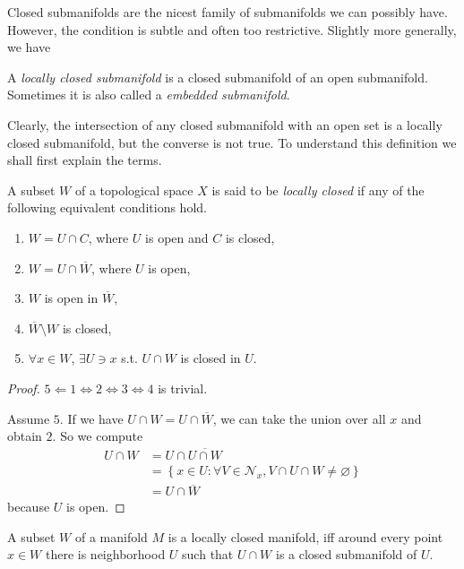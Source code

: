 Closed submanifolds are the nicest family of submanifolds we can possibly have. However, the condition is subtle and often too restrictive. Slightly more generally, we have

\begin{definition}
    A \emph{locally closed submanifold} is a closed submanifold of an open submanifold. Sometimes it is also called a \emph{embedded submanifold}.
\end{definition}

Clearly, the intersection of any closed submanifold with an open set is a locally closed submanifold, but the converse is not true. To understand this definition we shall first explain the terms.

\begin{proposition}\label{prop.locclose}
    A subset $W$ of a topological space $X$ is said to be \emph{locally closed} if any of the following equivalent conditions hold.
    \begin{enumerate}
        \item $W=U\cap C$, where $U$ is open and $C$ is closed,
        \item $W=U\cap\overline{W}$, where $U$ is open,
        \item $W$ is open in $\overline{W}$,
        \item $\overline{W}\setminus W$ is closed,
        \item $\forall x\in W$, $\exists U\ni x$ s.t. $U\cap W$ is closed in $U$.
    \end{enumerate}
\end{proposition}

\begin{proof}
    $5\Longleftarrow 1\Longleftrightarrow 2\Longleftrightarrow 3\Longleftrightarrow 4$ is trivial. 

    Assume $5$. If we have $U\cap W=U\cap\overline{W}$, we can take the union over all $x$ and obtain $2$. So we compute
    \begin{align*}
        U\cap W &= U\cap\overline{U\cap W} \\
        &= \left\{x\in U:\forall V\in\mathcal{N}_x, V\cap U\cap W\neq\varnothing\right\} \\
        &= U\cap\overline{W}
    \end{align*}
    because $U$ is open.
\end{proof}

\begin{proposition}
    A subset $W$ of a manifold $M$ is a locally closed manifold, iff around every point $x\in W$ there is neighborhood $U$ such that $U\cap W$ is a closed submanifold of $U$.
\end{proposition}

